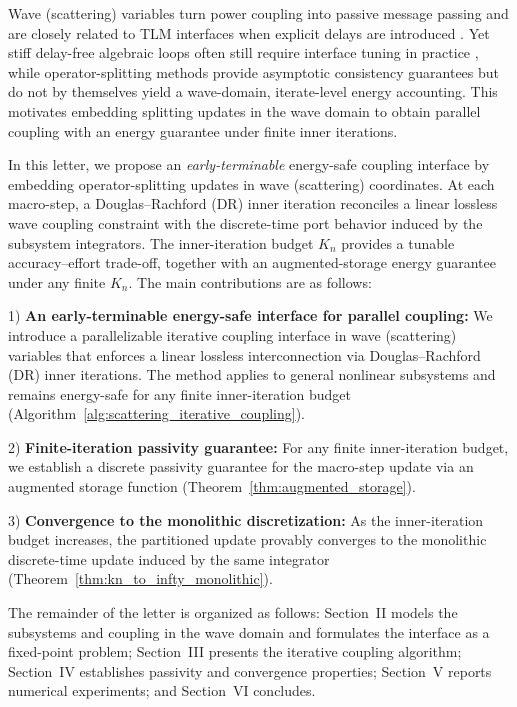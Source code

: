 Wave (scattering) variables turn power coupling into passive message passing \cite{cervera2007interconnection} and are closely related to TLM interfaces when explicit delays are introduced \cite{krus2011robust,braun2013multi,braun2022numerically,braun2024transmission}. 
Yet stiff delay-free algebraic loops often still require interface tuning in practice \cite{chen2021explicit,schweizer2015explicit}, while operator-splitting methods provide asymptotic consistency guarantees but do not by themselves yield a wave-domain, iterate-level energy accounting. 
This motivates embedding splitting updates in the wave domain to obtain parallel coupling with an energy guarantee under finite inner iterations.

In this letter, we propose an \emph{early-terminable} energy-safe coupling interface by embedding operator-splitting updates in wave (scattering) coordinates. 
At each macro-step, a Douglas--Rachford (DR) inner iteration reconciles a linear lossless wave coupling constraint with the discrete-time port behavior induced by the subsystem integrators. The inner-iteration budget $K_n$ provides a tunable accuracy--effort trade-off, together with an augmented-storage energy guarantee under any finite $K_n$.
The main contributions are as follows:

1) \textbf{An early-terminable energy-safe interface for parallel coupling:}
We introduce a parallelizable iterative coupling interface in wave (scattering) variables that enforces a linear lossless interconnection via Douglas--Rachford (DR) inner iterations. The method applies to general nonlinear subsystems and remains energy-safe for any finite inner-iteration budget (Algorithm~\ref{alg:scattering_iterative_coupling}).

2) \textbf{Finite-iteration passivity guarantee:}
For any finite inner-iteration budget, we establish a discrete passivity guarantee for the macro-step update via an augmented storage function (Theorem~\ref{thm:augmented_storage}).

3) \textbf{Convergence to the monolithic discretization:}
As the inner-iteration budget increases, the partitioned update provably converges to the monolithic discrete-time update induced by the same integrator (Theorem~\ref{thm:kn_to_infty_monolithic}).


The remainder of the letter is organized as follows: Section~II models the subsystems and coupling in the wave domain and formulates the interface as a fixed-point problem; Section~III presents the iterative coupling algorithm; Section~IV establishes passivity and convergence properties; Section~V reports numerical experiments; and Section~VI concludes.


